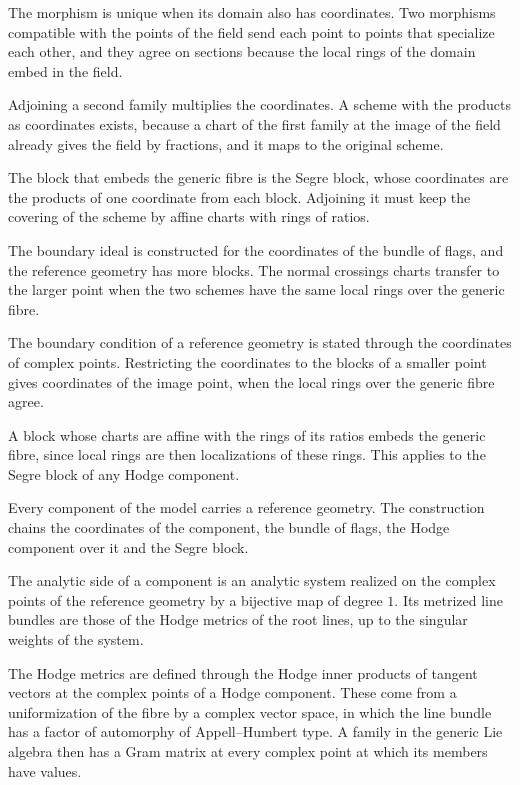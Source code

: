 The morphism is unique when its domain also has coordinates. Two morphisms compatible with the points of the field
send each point to points that specialize each other, and they agree on sections because the local rings of the
domain embed in the field.

Adjoining a second family multiplies the coordinates. A scheme with the products as coordinates exists, because a
chart of the first family at the image of the field already gives the field by fractions, and it maps to the
original scheme.

The block that embeds the generic fibre is the Segre block, whose coordinates are the products of one coordinate
from each block. Adjoining it must keep the covering of the scheme by affine charts with rings of ratios.

The boundary ideal is constructed for the coordinates of the bundle of flags, and the reference geometry has more
blocks. The normal crossings charts transfer to the larger point when the two schemes have the same local rings
over the generic fibre.

The boundary condition of a reference geometry is stated through the coordinates of complex points. Restricting
the coordinates to the blocks of a smaller point gives coordinates of the image point, when the local rings over
the generic fibre agree.

A block whose charts are affine with the rings of its ratios embeds the generic fibre, since local rings are then
localizations of these rings. This applies to the Segre block of any Hodge component.

Every component of the model carries a reference geometry. The construction chains the coordinates of the
component, the bundle of flags, the Hodge component over it and the Segre block.

The analytic side of a component is an analytic system realized on the complex points of the reference geometry by
a bijective map of degree $1$. Its metrized line bundles are those of the Hodge metrics of the root lines, up to
the singular weights of the system.

The Hodge metrics are defined through the Hodge inner products of tangent vectors at the complex points of a Hodge
component. These come from a uniformization of the fibre by a complex vector space, in which the line bundle has a
factor of automorphy of Appell--Humbert type. A family in the generic Lie algebra then has a Gram matrix at every
complex point at which its members have values.

